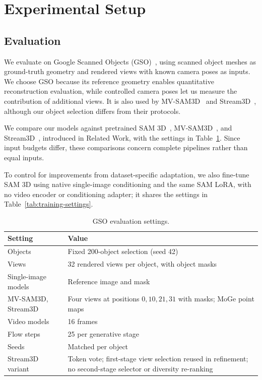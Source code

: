 \documentclass{article}
\begin{document}
\section{Experimental Setup}
\subsection{Evaluation}

We evaluate on Google Scanned Objects (GSO)~\cite{gso}, using scanned object meshes as ground-truth geometry and rendered views with known camera poses as inputs. We choose GSO because its reference geometry enables quantitative reconstruction evaluation, while controlled camera poses let us measure the contribution of additional views. It is also used by MV-SAM3D~\cite{mvsam3d} and Stream3D~\cite{stream3d}, although our object selection differs from their protocols.

We compare our models against pretrained SAM 3D~\cite{sam3d}, MV-SAM3D~\cite{mvsam3d}, and Stream3D~\cite{stream3d}, introduced in Related Work, with the settings in Table~\ref{tab:eval-settings}. Since input budgets differ, these comparisons concern complete pipelines rather than equal inputs.

To control for improvements from dataset-specific adaptation, we also fine-tune SAM 3D using native single-image conditioning and the same SAM LoRA, with no video encoder or conditioning adapter; it shares the settings in Table~\ref{tab:training-settings}.

\begin{table}[t]
\centering
\small
\caption{GSO evaluation settings.}
\label{tab:eval-settings}
\begin{tabular}{@{}p{}p{}@{}}
\toprule
Setting & Value \\
\midrule
Objects & Fixed 200-object selection (seed 42) \\
Views & 32 rendered views per object, with object masks \\
Single-image models & Reference image and mask \\
MV-SAM3D, Stream3D & Four views at positions $0,10,21,31$ with masks; MoGe point maps \\
Video models & 16 frames \\
Flow steps & 25 per generative stage \\
Seeds & Matched per object \\
Stream3D variant & Token vote; first-stage view selection reused in refinement; no second-stage selector or diversity re-ranking \\
\bottomrule
\end{tabular}
\end{table}
\end{document}
